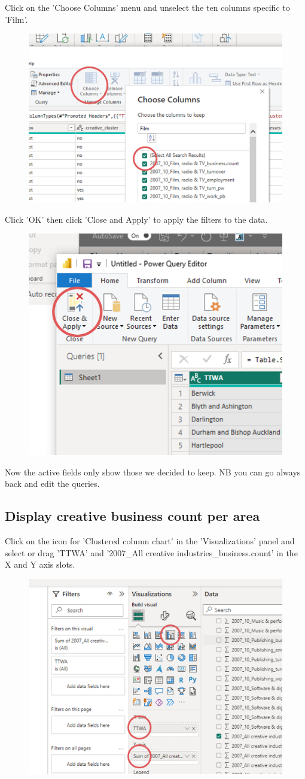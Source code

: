 \documentclass[11pt]{article}
\begin{document}
Click on the 'Choose Columns' menu and unselect the ten columns specific to 'Film'.

\begin{figure}[h!]
    \centering
    \includegraphics[width=.6\linewidth]{img/chooseColumn.png}
\end{figure}

Click 'OK' then click 'Close and Apply' to apply the filters to the data.

\begin{figure}[h!]
    \centering
    \includegraphics[width=.5\linewidth]{img/applyTransform.png}
\end{figure}

Now the active fields only show those we decided to keep. NB you can go always back and edit the queries.

\subsection{Display creative business count per area}

Click on the icon for 'Clustered column chart' in the 'Visualizations' panel and select or drag 'TTWA' and '2007\_All creative industries\_business.count' in the X and Y axis slots.

\begin{figure}[h!]
    \centering
    \includegraphics[width=.5\linewidth]{img/createCreativeChart.png}
\end{figure}
\end{document}

